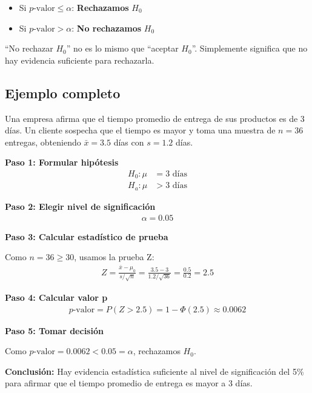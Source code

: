 \begin{itemize}
	\item Si $p\text{-valor} \leq \alpha$: \textbf{Rechazamos} $H_0$
	\item Si $p\text{-valor} > \alpha$: \textbf{No rechazamos} $H_0$
\end{itemize}

\begin{observacion}
	``No rechazar $H_0$'' no es lo mismo que ``aceptar $H_0$''. Simplemente significa que no hay evidencia suficiente para rechazarla.
\end{observacion}

\subsection{Ejemplo completo}

Una empresa afirma que el tiempo promedio de entrega de sus productos es de 3 días. Un cliente sospecha que el tiempo es mayor y toma una muestra de $n = 36$ entregas, obteniendo $\bar{x} = 3.5$ días con $s = 1.2$ días.

\textbf{Paso 1: Formular hipótesis}
\begin{align}
	H_0: \mu &= 3 \text{ días} \\
	H_a: \mu &> 3 \text{ días}
\end{align}

\textbf{Paso 2: Elegir nivel de significación}
\begin{align}
	\alpha = 0.05
\end{align}

\textbf{Paso 3: Calcular estadístico de prueba}

Como $n = 36 \geq 30$, usamos la prueba Z:
\begin{align}
	Z = \frac{\bar{x} - \mu_0}{s/\sqrt{n}} = \frac{3.5 - 3}{1.2/\sqrt{36}} = \frac{0.5}{0.2} = 2.5
\end{align}

\textbf{Paso 4: Calcular valor p}
\begin{align}
	p\text{-valor} = P(Z > 2.5) = 1 - \Phi(2.5) \approx 0.0062
\end{align}

\textbf{Paso 5: Tomar decisión}

Como $p\text{-valor} = 0.0062 < 0.05 = \alpha$, rechazamos $H_0$.

\textbf{Conclusión:} Hay evidencia estadística suficiente al nivel de significación del 5\% para afirmar que el tiempo promedio de entrega es mayor a 3 días.

